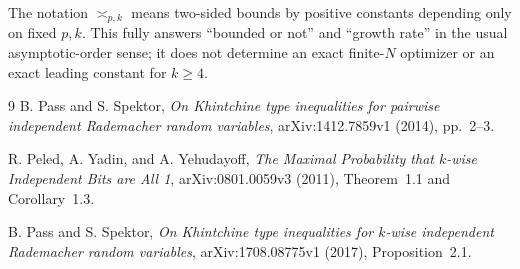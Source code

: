 \documentclass[11pt]{article}
\begin{document}
The notation $\asymp_{p,k}$ means two-sided bounds by positive constants depending only on fixed $p,k$.  This fully answers ``bounded or not'' and ``growth rate'' in the usual asymptotic-order sense; it does not determine an exact finite-$N$ optimizer or an exact leading constant for $k\ge4$.

{\raggedright
\begin{thebibliography}{9}
B. Pass and S. Spektor,
\emph{On Khintchine type inequalities for pairwise independent Rademacher random variables},
arXiv:1412.7859v1 (2014), pp.~2--3.

R. Peled, A. Yadin, and A. Yehudayoff,
\emph{The Maximal Probability that $k$-wise Independent Bits are All 1},
arXiv:0801.0059v3 (2011), Theorem~1.1 and Corollary~1.3.

B. Pass and S. Spektor,
\emph{On Khintchine type inequalities for $k$-wise independent Rademacher random variables},
arXiv:1708.08775v1 (2017), Proposition~2.1.
\end{thebibliography}
\par}
\end{document}

